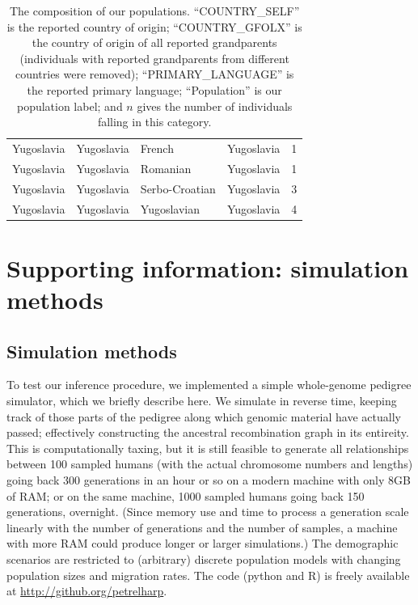 \documentclass{article}
\begin{document}
\begin{table}[!htp]
\begin{center}
\begin{tabular}{|l|l|l||l|r|}
      Yugoslavia &     Yugoslavia &           French &     Yugoslavia &    1 \\
      Yugoslavia &     Yugoslavia &         Romanian &     Yugoslavia &    1 \\
      Yugoslavia &     Yugoslavia &   Serbo-Croatian &     Yugoslavia &    3 \\
      Yugoslavia &     Yugoslavia &      Yugoslavian &     Yugoslavia &    4 \\
      \hline
\end{tabular}
\end{center}
\caption{
The composition of our populations.
``COUNTRY\_SELF'' is the reported country of origin;
``COUNTRY\_GFOLX'' is the country of origin of all reported grandparents
(individuals with reported grandparents from different countries were removed);
``PRIMARY\_LANGUAGE'' is the reported primary language;
``Population'' is our population label;
and $n$ gives the number of individuals falling in this category.
\label{stab:population_defns}
}
\end{table}

\clearpage


\section*{Supporting information: simulation methods}


\renewcommand{\thefigure}{S\arabic{figure}}
\setcounter{figure}{0}
\renewcommand{\thetable}{S\arabic{table}}
\setcounter{table}{0}
\renewcommand{\thesection}{S\arabic{section}}
\setcounter{section}{0}
\renewcommand{\thesubsection}{S\arabic{subsection}}
\setcounter{subsection}{0}

\subsection{Simulation methods}

To test our inference procedure, we implemented a simple whole-genome pedigree simulator,
which we briefly describe here.
We simulate in reverse time, 
keeping track of those parts of the pedigree along which genomic material have actually passed;
effectively constructing the ancestral recombination graph \citep{griffiths1997ancestral} in its entireity.
This is computationally taxing, but it is still feasible to generate all relationships between 100 sampled humans
(with the actual chromosome numbers and lengths) 
going back 300 generations in an hour or so on a modern machine with only 8GB of RAM;
or on the same machine, 1000 sampled humans going back 150 generations, overnight.
(Since memory use and time to process a generation scale linearly with the number of generations and the number of samples,
a machine with more RAM could produce longer or larger simulations.)
The demographic scenarios are restricted to (arbitrary) discrete population models
with changing population sizes and migration rates.
The code (python and R) is freely available at \url{http://github.org/petrelharp}.
\end{document}

